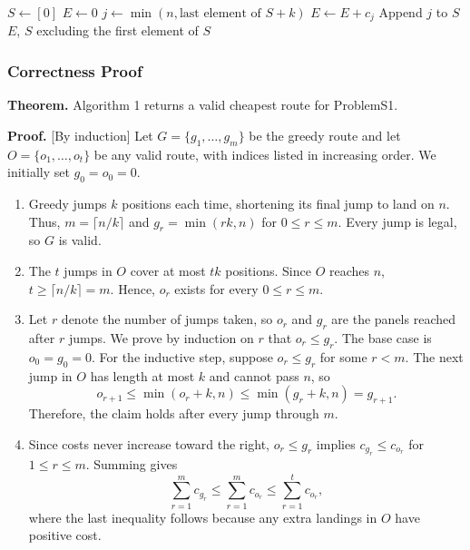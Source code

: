 \documentclass{article}
\begin{document}
\begin{algorithm}[H]
\caption{Greedy Route for ProblemS1}
\label{alg:s1}
\begin{algorithmic}[1]
    \State $S \gets [0]$ 
    \State $E \gets 0$ 
        \State $j \gets \min(n,\text{last element of }S+k)$
        \State $E \gets E+c_j$
        \State Append $j$ to $S$
    \EndWhile
    \State \Return $E$, $S$ excluding the first element of $S$
\EndProcedure
\end{algorithmic}
\end{algorithm}

\subsubsection{Correctness Proof}

\noindent\textbf{Theorem.} Algorithm 1 returns a valid cheapest route for ProblemS1.

\medskip
\noindent\textbf{Proof.} [By induction]
Let $G=\{g_1,\ldots,g_m\}$ be the greedy route and let $O=\{o_1,\ldots,o_t\}$ be any valid route, with indices listed in increasing order. We initially set $g_0=o_0=0$.

\begin{enumerate}
    \item Greedy jumps $k$ positions each time, shortening its final jump to land on $n$. Thus, $m=\lceil n/k\rceil$ and $g_r=\min(rk,n)$ for $0\le r\le m$. Every jump is legal, so $G$ is valid.

    \item The $t$ jumps in $O$ cover at most $tk$ positions. Since $O$ reaches $n$, $t\ge\lceil n/k\rceil=m$. Hence, $o_r$ exists for every $0\le r\le m$.

    \item Let $r$ denote the number of jumps taken, so $o_r$ and $g_r$ are the panels reached after $r$ jumps. We prove by induction on $r$ that $o_r\le g_r$. The base case is $o_0=g_0=0$. For the inductive step, suppose $o_r\le g_r$ for some $r<m$. The next jump in $O$ has length at most $k$ and cannot pass $n$, so
    \[
    o_{r+1}\le\min(o_r+k,n)\le\min(g_r+k,n)=g_{r+1}.
    \]
    Therefore, the claim holds after every jump through $m$.

    \item Since costs never increase toward the right, $o_r\le g_r$ implies $c_{g_r}\le c_{o_r}$ for $1\le r\le m$. Summing gives
    \[
    \sum_{r=1}^{m}c_{g_r}\le\sum_{r=1}^{m}c_{o_r}\le\sum_{r=1}^{t}c_{o_r},
    \]
    where the last inequality follows because any extra landings in $O$ have positive cost.
\end{enumerate}
\end{document}
